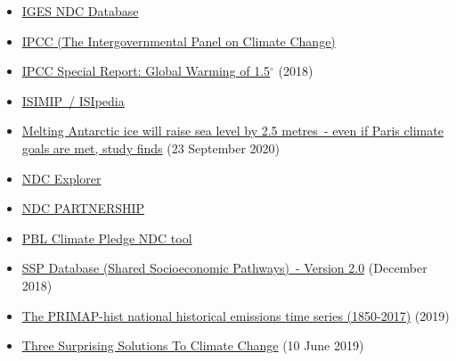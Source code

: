 \documentclass[12pt]{article}
\begin{document}
\begin{itemize}
 \vspace{-.2cm} \item \href{https://www.iges.or.jp/en/pub/iges-indc-ndc-database/en}{IGES NDC Database} 
 \vspace{-.2cm} \item \href{https://www.ipcc.ch/}{IPCC (The Intergovernmental Panel on Climate Change)} 
 \vspace{-.2cm} \item \href{https://www.ipcc.ch/sr15/}{IPCC Special Report: Global Warming of 1.5$^{\circ}$} (2018)
 \vspace{-.2cm} \item \href{https://www.isimip.org/isipedia/#isipedia-portal}{ISIMIP~/ ISIpedia} 
 \vspace{-.2cm} \item \href{https://www.theguardian.com/environment/2020/sep/23/melting-antarctic-ice-will-raise-sea-level-by-25-metres-even-if-paris-climate-goals-are-met-study-finds?CMP=share_btn_tw&utm_campaign=Carbon%20Brief%20Daily%20Briefing&utm_medium=email&utm_source=Revue%20newsletter}{Melting Antarctic ice will raise sea level by 2.5 metres~- even if Paris climate goals are met, study finds} (23 September 2020)
 \vspace{-.2cm} \item \href{https://klimalog.die-gdi.de/ndc/#NDCExplorer/worldMap?NDC??income???catIncome}{NDC Explorer} 
 \vspace{-.2cm} \item \href{https://ndcpartnership.org/}{NDC PARTNERSHIP} 
 \vspace{-.2cm} \item \href{https://themasites.pbl.nl/o/climate-ndc-policies-tool/}{PBL Climate Pledge NDC tool} 
 \vspace{-.2cm} \item \href{https://tntcat.iiasa.ac.at/SspDb/dsd?Action=htmlpage&page=about}{SSP Database (Shared Socioeconomic Pathways)~- Version 2.0} (December 2018)
 \vspace{-.2cm} \item \href{https://dataservices.gfz-potsdam.de/pik/showshort.php?id=escidoc:4736895}{The PRIMAP-hist national historical emissions time series (1850-2017)} (2019)
 \vspace{-.2cm} \item \href{https://www.forbes.com/sites/jeffmcmahon/2019/06/10/three-surprising-solutions-to-climate-change/?fbclid=IwAR3Drvr1uwPLKrYN2H1Rx-wOI3XsH51a7yGOC-7Pi0ebt9e_osxvlAlM0s8#77c983fe6742}{Three Surprising Solutions To Climate Change} (10 June 2019)

\end{itemize}
\end{document}
